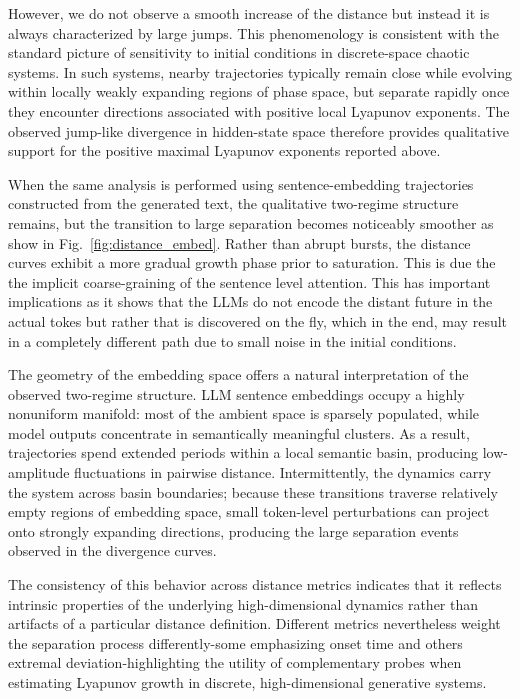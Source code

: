 \documentclass[aip%
 aip,
 amsmath,amssymb,
 reprint,%
]{revtex4-1}
\begin{document}
However, we do not observe a smooth increase of the distance but instead it is always characterized by large jumps. This phenomenology is consistent with the standard picture of sensitivity to initial conditions in discrete-space chaotic systems. In such systems, nearby trajectories typically remain close while evolving within locally weakly expanding regions of phase space, but separate rapidly once they encounter directions associated with positive local Lyapunov exponents. The observed jump-like divergence in hidden-state space therefore provides qualitative support for the positive maximal Lyapunov exponents reported above.

When the same analysis is performed using sentence-embedding trajectories constructed from the generated text, the qualitative two-regime structure remains, but the transition to large separation becomes noticeably smoother as show in Fig.~\ref{fig:distance_embed}. Rather than abrupt bursts, the distance curves exhibit a more gradual growth phase prior to saturation. This is due the the implicit coarse-graining of the sentence level attention.  This has important implications as it shows that the LLMs do not encode the distant future in the actual tokes but rather that is discovered on the fly, which in the end, may result in a completely different path due to small noise in the initial conditions.


The geometry of the embedding space offers a natural interpretation of the observed two-regime structure. LLM sentence embeddings occupy a highly nonuniform manifold: most of the ambient space is sparsely populated, while model outputs concentrate in semantically meaningful clusters\cite{butusov2019effects}. As a result, trajectories spend extended periods within a local semantic basin, producing low-amplitude fluctuations in pairwise distance. Intermittently, the dynamics carry the system across basin boundaries; because these transitions traverse relatively empty regions of embedding space, small token-level perturbations can project onto strongly expanding directions, producing the large separation events observed in the divergence curves.

The consistency of this behavior across distance metrics indicates that it reflects intrinsic properties of the underlying high-dimensional dynamics rather than artifacts of a particular distance definition. Different metrics nevertheless weight the separation process differently-some emphasizing onset time and others extremal deviation-highlighting the utility of complementary probes when estimating Lyapunov growth in discrete, high-dimensional generative systems.
\end{document}

